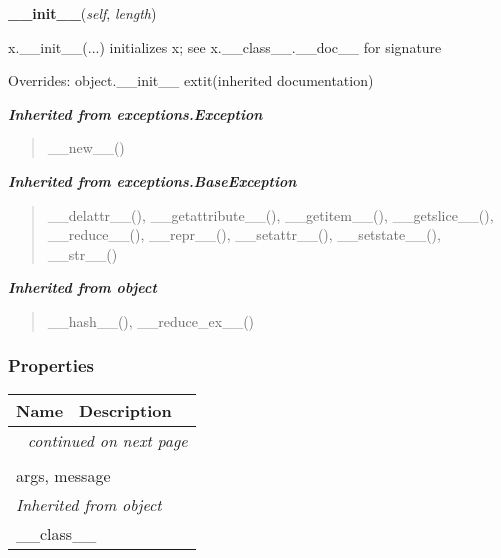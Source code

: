     \vspace{0.5ex}

\hspace{.8\funcindent}\begin{boxedminipage}{\funcwidth}

    \raggedright \textbf{\_\_init\_\_}(\textit{self}, \textit{length})

\setlength{\parskip}{2ex}
    x.\_\_init\_\_(...) initializes x; see x.\_\_class\_\_.\_\_doc\_\_ for 
    signature

\setlength{\parskip}{1ex}
      Overrides: object.\_\_init\_\_ 	extit{(inherited documentation)}

    \end{boxedminipage}


\large{\textbf{\textit{Inherited from exceptions.Exception}}}

\begin{quote}
\_\_new\_\_()
\end{quote}

\large{\textbf{\textit{Inherited from exceptions.BaseException}}}

\begin{quote}
\_\_delattr\_\_(), \_\_getattribute\_\_(), \_\_getitem\_\_(), \_\_getslice\_\_(), \_\_reduce\_\_(), \_\_repr\_\_(), \_\_setattr\_\_(), \_\_setstate\_\_(), \_\_str\_\_()
\end{quote}

\large{\textbf{\textit{Inherited from object}}}

\begin{quote}
\_\_hash\_\_(), \_\_reduce\_ex\_\_()
\end{quote}


  \subsubsection{Properties}

    \vspace{-1cm}
\hspace{\varindent}\begin{longtable}{|p{\varnamewidth}|p{\vardescrwidth}|l}
\cline{1-2}
\cline{1-2} \centering \textbf{Name} & \centering \textbf{Description}& \\
\cline{1-2}
\endhead\cline{1-2}\multicolumn{3}{r}{\small\textit{continued on next page}}\\\endfoot\cline{1-2}
\endlastfoot\multicolumn{2}{|l|}{\textit{Inherited from exceptions.BaseException}}\\
\multicolumn{2}{|p{\varwidth}|}{\raggedright args, message}\\
\cline{1-2}
\multicolumn{2}{|l|}{\textit{Inherited from object}}\\
\multicolumn{2}{|p{\varwidth}|}{\raggedright \_\_class\_\_}\\
\cline{1-2}
\end{longtable}

